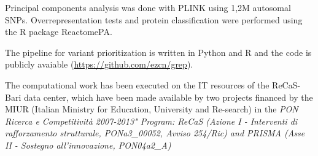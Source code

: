 Principal components analysis was done with PLINK\cite{chang2015second} using 1,2M autosomal SNPs. 
Overrepresentation tests and protein classification were performed using the R package ReactomePA\cite{yu2016reactomepa}.  


The \gp pipeline for variant prioritization is written in Python and R and the code is publicly avaiable (\url{https://github.com/ezcn/grep}). 


The computational work has been executed on the IT resources of the ReCaS-Bari data center, which have been made available by two projects financed by the MIUR (Italian Ministry for Education, University and Re-search) in the \textit{PON Ricerca e Competitività 2007-2013" Program: ReCaS (Azione I - Interventi di rafforzamento strutturale, PONa3\_00052, Avviso 254/Ric) and PRISMA (Asse II - Sostegno all'innovazione, PON04a2\_A)}






